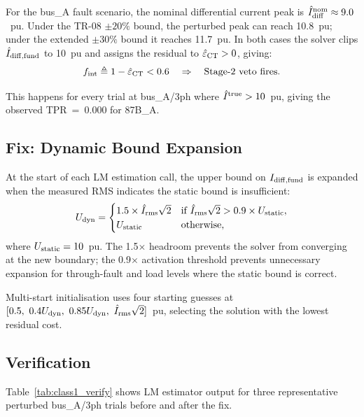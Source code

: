 \documentclass[12pt,a4paper]{article}
\newcommand{\fint}{f_{\rm int}}
\begin{document}
For the bus\_A fault scenario, the nominal differential current peak
is $\hat{I}_{\rm diff}^{\rm nom} \approx 9.0$~pu.  Under the TR-08
$\pm20\%$ bound, the perturbed peak can reach 10.8~pu; under the
extended $\pm30\%$ bound it reaches 11.7~pu.  In both cases the solver
clips $\hat{I}_{\rm diff,fund}$ to 10~pu and assigns the residual to
$\hat{\varepsilon}_{\rm CT} > 0$, giving:
\begin{equation}
  \fint \triangleq 1 - \hat{\varepsilon}_{\rm CT} < 0.6
  \quad\Rightarrow\quad \text{Stage-2 veto fires.}
\end{equation}

This happens for every trial at bus\_A/3ph where $\hat{I}^{\rm true} > 10$~pu,
giving the observed TPR~=~0.000 for 87B\_A.

\subsection{Fix: Dynamic Bound Expansion}

At the start of each LM estimation call, the upper bound on
$I_{\rm diff,fund}$ is expanded when the measured RMS indicates the
static bound is insufficient:
\begin{equation}
  U_{\rm dyn} =
  \begin{cases}
    1.5 \times \hat{I}_{\rm rms}\sqrt{2}
    & \text{if } \hat{I}_{\rm rms}\sqrt{2} > 0.9 \times U_{\rm static}, \\
    U_{\rm static} & \text{otherwise,}
  \end{cases}
  \label{eq:dynub}
\end{equation}
where $U_{\rm static} = 10$~pu.  The 1.5$\times$ headroom prevents the
solver from converging at the new boundary; the 0.9$\times$ activation
threshold prevents unnecessary expansion for through-fault and load
levels where the static bound is correct.

Multi-start initialisation uses four starting guesses at
$[0.5,\ 0.4 U_{\rm dyn},\ 0.85 U_{\rm dyn},\ \hat{I}_{\rm rms}\sqrt{2}]$~pu,
selecting the solution with the lowest residual cost.

\subsection{Verification}

Table~\ref{tab:class1_verify} shows LM estimator output for three
representative perturbed bus\_A/3ph trials before and after the fix.
\end{document}
